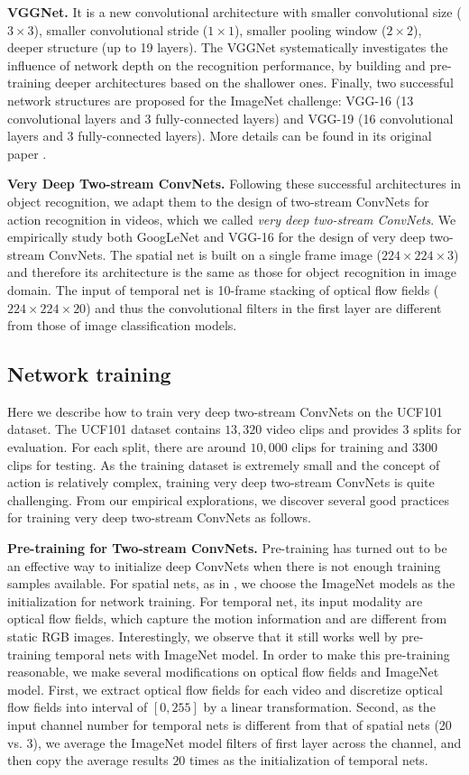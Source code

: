 \documentclass[10pt,twocolumn,letterpaper]{article}
\begin{document}
\textbf{VGGNet.} It is a new convolutional architecture with smaller convolutional size ($3 \times 3$), smaller convolutional stride ($1 \times 1$), smaller pooling window ($2 \times 2$), deeper structure (up to 19 layers). The VGGNet systematically investigates the influence of network depth on the recognition performance, by building and pre-training deeper architectures based on the shallower ones. Finally, two successful network structures are proposed for the ImageNet challenge: VGG-16 (13 convolutional layers and 3 fully-connected layers) and VGG-19 (16 convolutional layers and 3 fully-connected layers). More details can be found in its original paper \cite{SimonyanZ14a}.


\textbf{Very Deep Two-stream ConvNets.} Following these successful architectures in object recognition, we adapt them to the design of two-stream ConvNets for action recognition in videos, which we called \emph{very deep two-stream ConvNets}. We empirically study both GoogLeNet and VGG-16 for the design of very deep two-stream ConvNets. The spatial net is built on a single frame image ($224 \times 224 \times 3$) and therefore its architecture is the same as those for object recognition in image domain. The input of temporal net is 10-frame stacking of optical flow fields ($224 \times 224 \times 20$) and thus the convolutional filters in the first layer are different from those of image classification models.

\subsection{Network training}
Here we describe how to train very deep two-stream ConvNets on the UCF101 dataset. The UCF101 dataset contains $13,320$ video clips and provides 3 splits for evaluation. For each split, there are around $10,000$ clips for training and $3300$ clips for testing. As the training dataset is extremely small and the concept of action is relatively complex, training very deep two-stream ConvNets is quite challenging. From our empirical explorations, we discover several good practices for training very deep two-stream ConvNets as follows.

\textbf{Pre-training for Two-stream ConvNets.} Pre-training has turned out to be an effective way to initialize deep ConvNets when there is not enough training samples available. For spatial nets, as in \cite{SimonyanZ14}, we choose the ImageNet models as the initialization for network training. For temporal net, its input modality are optical flow fields, which capture the motion information and are different from static RGB images. Interestingly, we observe that it still works well by pre-training temporal nets with ImageNet model. In order to make this pre-training reasonable, we make several modifications on optical flow fields and ImageNet model. First, we extract optical flow fields for each video and discretize optical flow fields into interval of $[0,255]$ by a linear transformation. Second, as the input channel number for temporal nets is different from that of spatial nets (20 vs. 3), we average the ImageNet model filters of first layer across the channel, and then copy the average results $20$ times as the initialization of temporal nets.
\end{document}
